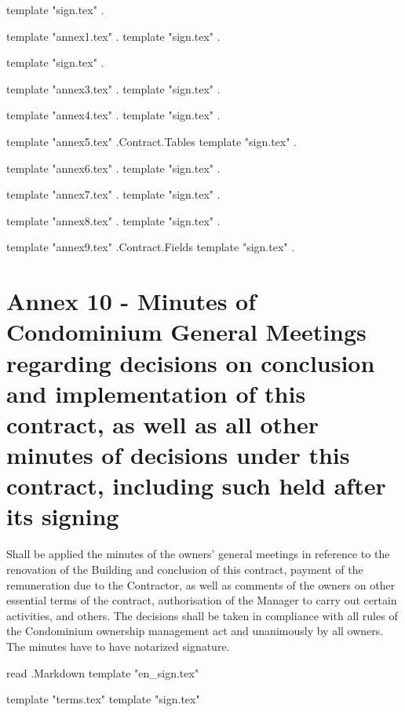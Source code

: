 \vspace{2cm}
{{template "sign.tex" .}} %

{{template "annex1.tex" .}} %
{{template "sign.tex" .}} %

{{template "sign.tex" .}} %

{{template "annex3.tex" .}} %
{{template "sign.tex" .}} %

{{template "annex4.tex" .}} %
{{template "sign.tex" .}} %

{{template "annex5.tex" .Contract.Tables}} %
{{template "sign.tex" .}} %

{{template "annex6.tex" .}} %
{{template "sign.tex" .}} %

{{template "annex7.tex" .}} %
{{template "sign.tex" .}} %

{{template "annex8.tex" .}} %
{{template "sign.tex" .}} %

{{template "annex9.tex" .Contract.Fields}} %
{{template "sign.tex" .}} %

\pagebreak
\section{Annex 10 {-} Minutes of Condominium General Meetings regarding decisions on conclusion and implementation of this contract, as well as all other minutes of decisions under this contract, including such held after its signing}

Shall be applied the minutes of the owners’ general meetings in reference to the renovation of the Building and conclusion of this contract, payment of the remuneration due to the Contractor, as well as comments of the owners on other essential terms of the contract, authorisation of the Manager to carry out certain activities, and others. The decisions shall be taken in compliance with all rules of the Condominium ownership management act and unanimously by all owners. The minutes have to have notarized signature.

\vspace{2cm}
{{read .Markdown}} %
{{template "en_sign.tex"}} %
\FloatBarrier{}\mbox{}\vfill\pagebreak %

{{template "terms.tex"}} %
{{template "sign.tex"}} %

